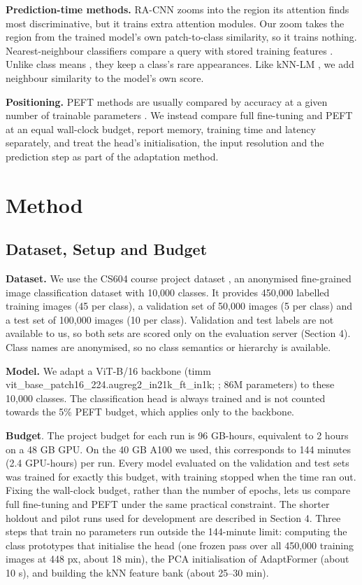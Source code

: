 \textbf{Prediction-time methods.} RA-CNN \citep{fu2017racnn} zooms into the region its attention finds most discriminative, but it trains extra attention modules. Our zoom takes the region from the trained model's own patch-to-class similarity, so it trains nothing. Nearest-neighbour classifiers compare a query with stored training features \citep{wu2018instance}. Unlike class means \citep{mensink2013ncm}, they keep a class's rare appearances. Like kNN-LM \citep{khandelwal2020knnlm}, we add neighbour similarity to the model's own score.

\textbf{Positioning.} PEFT methods are usually compared by accuracy at a given number of trainable parameters \citep[e.g.,][]{hu2022lora,jia2022vpt,chen2022adaptformer}. We instead compare full fine-tuning and PEFT at an equal wall-clock budget, report memory, training time and latency separately, and treat the head's initialisation, the input resolution and the prediction step as part of the adaptation method.

\section{Method}\label{method}

\subsection{Dataset, Setup and Budget}\label{dataset-setup-and-budget}

\textbf{Dataset.} We use the CS604 course project dataset \citep{cs604data}, an anonymised fine-grained image classification dataset with 10,000 classes. It provides 450,000 labelled training images (45 per class), a validation set of 50,000 images (5 per class) and a test set of 100,000 images (10 per class). Validation and test labels are not available to us, so both sets are scored only on the evaluation server (Section 4). Class names are anonymised, so no class semantics or hierarchy is available.

\textbf{Model.} We adapt a ViT-B/16 backbone (timm vit\_base\_patch16\_224.augreg2\_in21k\_ft\_in1k; \citealp{rw2019timm}; 86M parameters) to these 10,000 classes. The classification head is always trained and is not counted towards the 5\% PEFT budget, which applies only to the backbone.

\textbf{Budget}. The project budget for each run is 96 GB-hours, equivalent to 2 hours on a 48 GB GPU. On the 40 GB A100 we used, this corresponds to 144 minutes (2.4 GPU-hours) per run. Every model evaluated on the validation and test sets was trained for exactly this budget, with training stopped when the time ran out. Fixing the wall-clock budget, rather than the number of epochs, lets us compare full fine-tuning and PEFT under the same practical constraint. The shorter holdout and pilot runs used for development are described in Section 4. Three steps that train no parameters run outside the 144-minute limit: computing the class prototypes that initialise the head (one frozen pass over all 450,000 training images at 448 px, about 18 min), the PCA initialisation of AdaptFormer (about 10 s), and building the kNN feature bank (about 25--30 min).

